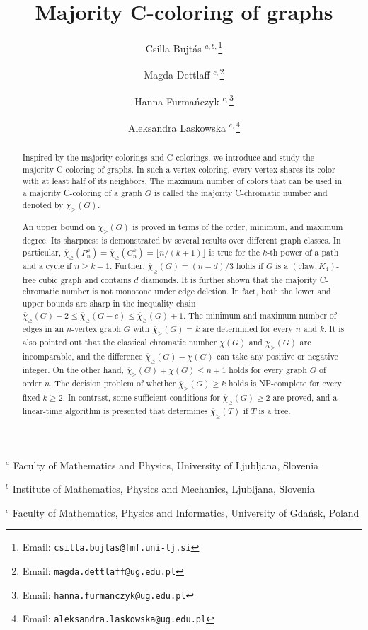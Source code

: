 \documentclass{article}
\theoremstyle{definition}
\newcommand{\mc}{\overline{\chi}_{\geqslant}}
\begin{document}
\title{Majority C-coloring of graphs}
\author{
Csilla Bujt\'as $^{a,b,}$\thanks{Email: \texttt{csilla.bujtas@fmf.uni-lj.si}}
\and
Magda Dettlaff $^{c,}$\thanks{Email: \texttt{magda.dettlaff@ug.edu.pl}}
\and
Hanna Furma\'nczyk $^{c,}$\thanks{Email: \texttt{hanna.furmanczyk@ug.edu.pl}}
\and
Aleksandra Laskowska $^{c,}$\thanks{Email: \texttt{aleksandra.laskowska@ug.edu.pl}}
}
\date{}
\maketitle

\begin{center}
$^a$ Faculty of Mathematics and Physics, University of Ljubljana, Slovenia\\
\medskip

$^b$ Institute of Mathematics, Physics and Mechanics, Ljubljana, Slovenia\\
\medskip

$^c$ Faculty of Mathematics, Physics and Informatics, University of Gda\'nsk, Poland\\
\medskip
\end{center}
\maketitle

\begin{abstract}
Inspired by the majority colorings and C-colorings, we introduce and study the majority C-coloring of graphs. In such a vertex coloring, every vertex shares its color with at least half of its neighbors. The maximum number of colors that can be used in a majority C-coloring of a graph $G$ is called the majority C-chromatic number and denoted by $\mc(G)$. 

An upper bound on $\mc(G)$ is proved in terms of the order, minimum, and maximum degree. Its sharpness is demonstrated by several results over different graph classes. In particular, $\mc(P_n^k)= \mc(C_n^k)= \lfloor n/(k+1)\rfloor$ is true for the $k$-th power of a path and a cycle if $n \ge k+1$. Further, $\mc(G) = (n-d)/3$ holds if $G$ is a $(\mbox{claw}, K_4)$-free cubic graph and contains $d$ diamonds. %
It is further shown that the majority C-chromatic number is not monotone under edge deletion. In fact, both the lower and upper bounds are sharp in the inequality chain $\mc(G)-2 \leq \mc(G-e) \leq \mc(G) +1$. The minimum and maximum number of edges in an $n$-vertex graph $G$ with $\mc(G)=k$ are determined for every $n$ and $k$. It is also pointed out that the classical chromatic number $\chi(G)$ and $\mc(G)$ are incomparable, and the difference $\mc(G)-\chi(G)$ can take any positive or negative integer. On the other hand,  $\mc(G)+\chi(G) \leq n+1$ holds for every graph $G$ of order $n$. The decision problem of whether $\mc(G) \ge k$ holds is NP-complete for every fixed $k\ge 2$. In contrast, some sufficient conditions for $\mc(G) \ge 2$ are proved, and a linear-time algorithm is presented that determines $\mc(T)$ if $T$ is a tree. 
\end{abstract}
\medskip
\end{document}
